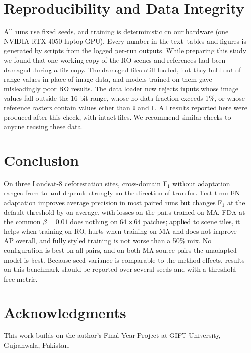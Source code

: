 \documentclass[11pt]{article}
\newcommand{\Fone}{F$_1$}
\begin{document}
\section{Reproducibility and Data Integrity}\label{sec:repro}

All runs use fixed seeds, and training is deterministic on our hardware (one NVIDIA RTX 4050 laptop GPU).
Every number in the text, tables and figures is generated by scripts from the logged per-run outputs.
While preparing this study we found that one working copy of the RO scenes and references had been damaged during a file copy.
The damaged files still loaded, but they held out-of-range values in place of image data, and models trained on them gave misleadingly poor RO results.
The data loader now rejects inputs whose image values fall outside the 16-bit range, whose no-data fraction exceeds 1\%, or whose reference rasters contain values other than 0 and 1.
All results reported here were produced after this check, with intact files.
We recommend similar checks to anyone reusing these data.

\section{Conclusion}\label{sec:conclusion}

On three Landsat-8 deforestation sites, cross-domain \Fone{} without adaptation ranges from \SOMin{} to \SOMax{} and depends strongly on the direction of transfer.
Test-time BN adaptation improves average precision in most paired runs but changes \Fone{} at the default threshold by \TTAAllD{} on average, with losses on the pairs trained on MA.
FDA at the common $\beta=0.01$ does nothing on $64\times64$ patches; applied to scene tiles, it helps when training on RO, hurts when training on MA and does not improve AP overall, and fully styled training is not worse than a 50\% mix.
No configuration is best on all pairs, and on both MA-source pairs the unadapted model is best.
Because seed variance is comparable to the method effects, results on this benchmark should be reported over several seeds and with a threshold-free metric.

\section*{Acknowledgments}
This work builds on the author's Final Year Project at GIFT University, Gujranwala, Pakistan.


\end{document}
